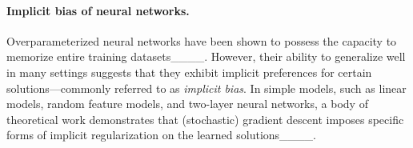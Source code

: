 

\paragraph{Implicit bias of neural networks.}
Overparameterized neural networks have been shown to possess the capacity to memorize entire training datasets____. However, their ability to generalize well in many settings suggests that they exhibit implicit preferences for certain solutions—commonly referred to as \emph{implicit bias}. In simple models, such as linear models, random feature models, and two-layer neural networks, a body of theoretical work demonstrates that (stochastic) gradient descent imposes specific forms of implicit regularization on the learned solutions____.

